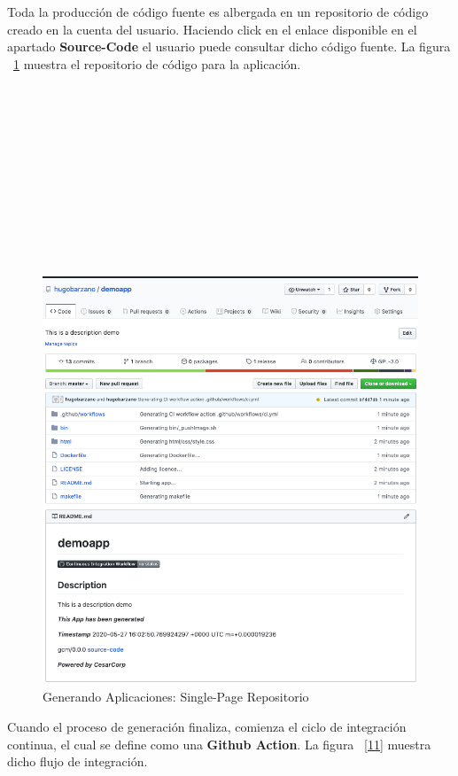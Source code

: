 \documentclass[a4paper,11pt]{book}
\begin{document}
Toda la producción de código fuente es albergada en un repositorio de código creado en la cuenta del usuario. Haciendo click en el enlace disponible en el apartado \textbf{Source-Code}
el usuario puede consultar dicho código fuente.  La figura ~\ref{10} muestra el repositorio de código para la aplicación. 
~\\
~\\
~\\
~\\
~\\
~\\
~\\
~\\
~\\
~\\
~\\
~\\
\begin{figure}[H]
\centering
\includegraphics[scale=0.5]{imagenes/casouso_a/10.png}
\caption{  Generando Aplicaciones: Single-Page Repositorio }
\label{10}
\end{figure}

Cuando el proceso de generación finaliza, comienza el ciclo de integración continua, el cual se define como una \textbf{Github Action}. La figura ~\ref{11} muestra dicho flujo de integración. 
~\\
~\\
~\\
~\\
~\\
\end{document}
